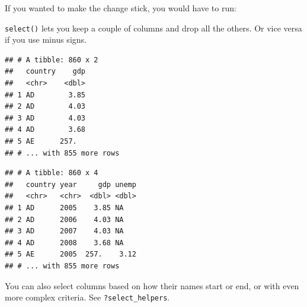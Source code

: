 \documentclass[12pt,oneside,openany]{book}
\newenvironment{Shaded}{\begin{snugshade}}{\end{snugshade}}
\newcommand{\KeywordTok}[1]{\textcolor[rgb]{0.13,0.29,0.53}{\textbf{#1}}}
\newcommand{\DataTypeTok}[1]{\textcolor[rgb]{0.13,0.29,0.53}{#1}}
\newcommand{\StringTok}[1]{\textcolor[rgb]{0.31,0.60,0.02}{#1}}
\newcommand{\OperatorTok}[1]{\textcolor[rgb]{0.81,0.36,0.00}{\textbf{#1}}}
\newcommand{\NormalTok}[1]{#1}
\begin{document}
If you wanted to make the change stick, you would have to run:

\begin{Shaded}
\end{Shaded}

\texttt{select()} lets you keep a couple of columns and drop all the
others. Or vice versa if you use minus signs.

\begin{Shaded}
\end{Shaded}

\begin{verbatim}
## # A tibble: 860 x 2
##   country    gdp
##   <chr>    <dbl>
## 1 AD        3.85
## 2 AD        4.03
## 3 AD        4.03
## 4 AD        3.68
## 5 AE      257.  
## # ... with 855 more rows
\end{verbatim}

\begin{Shaded}
\end{Shaded}

\begin{verbatim}
## # A tibble: 860 x 4
##   country year     gdp unemp
##   <chr>   <chr>  <dbl> <dbl>
## 1 AD      2005    3.85 NA   
## 2 AD      2006    4.03 NA   
## 3 AD      2007    4.03 NA   
## 4 AD      2008    3.68 NA   
## 5 AE      2005  257.    3.12
## # ... with 855 more rows
\end{verbatim}

You can also select columns based on how their names start or end, or
with even more complex criteria. See \texttt{?select\_helpers}.

\begin{Shaded}
\end{Shaded}
\end{document}
